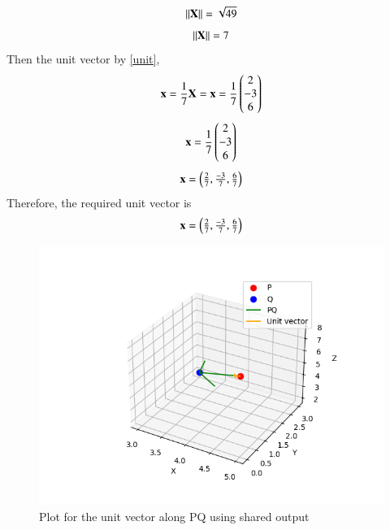 \documentclass[journal]{IEEEtran}
\begin{document}
         \begin{align}
             \left\lVert\mathbf{X}\right\rVert=\sqrt{49}
         \end{align}
         \begin{align}
             \left\lVert\mathbf{X}\right\rVert=7
         \end{align}
         Then the unit vector by \eqref{unit},\\
         \begin{align}
             \mathbf{x}=\frac{1}{7}\mathbf{X}=\mathbf{x}=\frac{1}{7}\begin{pmatrix}2\\-3\\6\end{pmatrix}
         \end{align}
         \begin{align}
             \mathbf{x}=\frac{1}{7}\begin{pmatrix}2\\-3\\6\end{pmatrix}
         \end{align}
         \begin{align}
             \mathbf{x}=\begin{pmatrix}\frac{2}{7},\frac{-3}{7},\frac{6}{7}\end{pmatrix}
         \end{align}
         Therefore, the required unit vector is\\
         \begin{align}
             \mathbf{x}=\begin{pmatrix}\frac{2}{7},\frac{-3}{7},\frac{6}{7}\end{pmatrix}
         \end{align}
         \begin{figure}
             \centering
             \includegraphics[width=1\columnwidth]{figs/Figure1.png}
             \caption{Plot for the unit vector along PQ using shared output }
             \label{fig:fig21}
         \end{figure}
\end{document}
